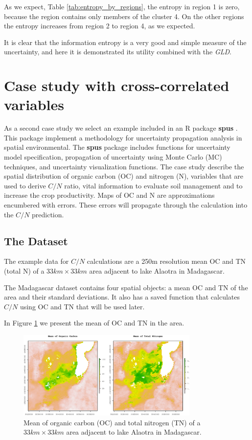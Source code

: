 As we expect, Table \ref{tab:entropy_by_regions}, the entropy in region 1 is zero, because the region contains only members of the cluster 4. On the other regions the entropy increases from region 2 to region 4, as we expected.

It is clear that the information entropy is a very good and simple measure of the uncertainty, and here it is demonstrated its utility combined with the \textit{GLD}.


\section{Case study with cross-correlated variables}
As a second case study we select an example included in an R package \textbf{spus} \cite{Sawicka2016}. This package implement a methodology for uncertainty propagation analysis in spatial environmental. The \textbf{spus} package includes functions for uncertainty model specification, propagation of uncertainty using Monte Carlo (MC) techniques, and uncertainty visualization functions.
The case study describe the spatial distribution of organic carbon (OC) and nitrogen (N), variables that are used to derive $C/N$ ratio, vital information to evaluate soil management and to increase the crop productivity. Maps of OC and N are approximations encumbered with errors. These errors will propagate through the calculation into the $C/N$ prediction.

\subsection{The Dataset}
The example data for $C/N$ calculations are a 250m resolution mean OC and TN (total N) of a $33km \times 33km$ area adjacent to lake Alaotra in Madagascar.

The Madagascar dataset contains four spatial objects: a mean OC and TN of the area and their standard deviations. It also has a saved function that calculates $C/N$ using OC and TN that will be used later.

In Figure \ref{fig:mean_oc_tn} we present the mean of OC and TN in the area.

\begin{figure}[H]
    \centering
    \includegraphics[width=0.8\textwidth]{img/use_cases/spus/dataset_example.eps}
    \caption{Mean of organic carbon (OC) and total nitrogen (TN) of a $33km \times 33km$ area adjacent to lake Alaotra in Madagascar.}
    \label{fig:mean_oc_tn}
\end{figure}

